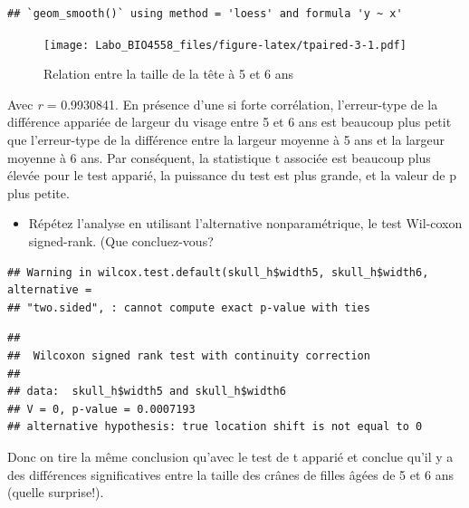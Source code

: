 \documentclass[
  12pt,
]{book}
\newenvironment{Shaded}{\begin{snugshade}}{\end{snugshade}}
\newcommand{\DataTypeTok}[1]{\textcolor[rgb]{0.13,0.29,0.53}{#1}}
\newcommand{\KeywordTok}[1]{\textcolor[rgb]{0.13,0.29,0.53}{\textbf{#1}}}
\newcommand{\NormalTok}[1]{#1}
\newcommand{\OperatorTok}[1]{\textcolor[rgb]{0.81,0.36,0.00}{\textbf{#1}}}
\newcommand{\OtherTok}[1]{\textcolor[rgb]{0.56,0.35,0.01}{#1}}
\newcommand{\StringTok}[1]{\textcolor[rgb]{0.31,0.60,0.02}{#1}}
\providecommand{\tightlist}{%
  \setlength{\itemsep}{0pt}\setlength{\parskip}{0pt}}
\begin{document}
\begin{verbatim}
## `geom_smooth()` using method = 'loess' and formula 'y ~ x'
\end{verbatim}

\begin{figure}
\centering
\texttt{[image: Labo\_BIO4558\_files/figure-latex/tpaired-3-1.pdf]}
\caption{\label{fig:tpaired-3}Relation entre la taille de la tête à 5 et 6 ans}
\end{figure}

Avec \emph{r} = 0.9930841. En présence d'une si forte corrélation, l'erreur-type de la différence appariée de largeur du visage entre 5 et 6 ans est beaucoup plus petit que l'erreur-type de la différence entre la largeur moyenne à 5 ans et la largeur moyenne à 6 ans. Par conséquent, la statistique t associée est beaucoup plus élevée pour le test apparié, la puissance du test est plus grande, et la valeur de p plus petite.

\begin{itemize}
\tightlist
\item
  Répétez l'analyse en utilisant l'alternative nonparamétrique, le test Wil-coxon signed-rank. (Que concluez-vous?
\end{itemize}

\begin{Shaded}
\end{Shaded}

\begin{verbatim}
## Warning in wilcox.test.default(skull_h$width5, skull_h$width6, alternative =
## "two.sided", : cannot compute exact p-value with ties
\end{verbatim}

\begin{verbatim}
## 
##  Wilcoxon signed rank test with continuity correction
## 
## data:  skull_h$width5 and skull_h$width6
## V = 0, p-value = 0.0007193
## alternative hypothesis: true location shift is not equal to 0
\end{verbatim}

Donc on tire la même conclusion qu'avec le test de t apparié et conclue qu'il y a des différences significatives entre la taille des crânes de filles âgées de 5 et 6 ans (quelle surprise!).
\end{document}

